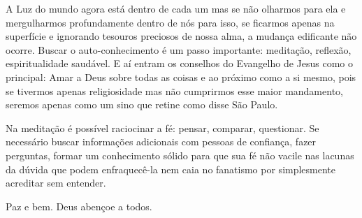 \emdash{}A Luz do mundo agora está dentro de cada um mas se não olharmos para ela e mergulharmos profundamente dentro de nós para isso, se ficarmos apenas na superfície e ignorando tesouros preciosos de nossa alma, a mudança edificante não ocorre. Buscar o auto-conhecimento é um passo importante: meditação, reflexão, espiritualidade saudável. E aí entram os conselhos do Evangelho de Jesus como o principal: Amar a Deus sobre todas as coisas e ao próximo como a si mesmo, pois se tivermos apenas religiosidade mas não cumprirmos esse maior mandamento, seremos apenas como um sino que retine como disse São Paulo.

\emdash{}Na meditação é possível raciocinar a fé: pensar, comparar, questionar. Se necessário buscar informações adicionais com pessoas de confiança, fazer perguntas, formar um conhecimento sólido para que sua fé não vacile nas lacunas da dúvida que podem enfraquecê-la nem caia no fanatismo por simplesmente acreditar sem entender.



\emdash{}Paz e bem. Deus abençoe a todos.